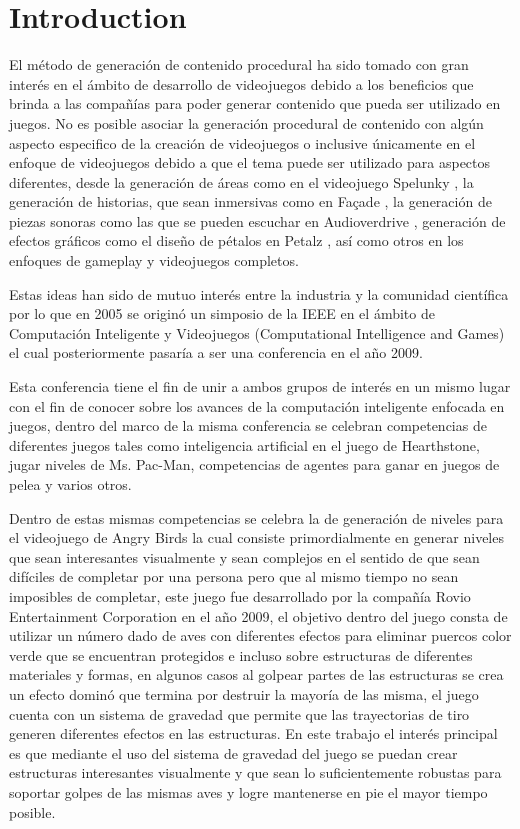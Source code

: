 \chapter{Introduction}
\label{chapter:introduction}

El método de generación de contenido procedural ha sido tomado con
gran interés en el ámbito de desarrollo de videojuegos debido a los beneficios
que brinda a las compañías para poder generar contenido que pueda ser utilizado
en juegos. No es posible asociar la generación procedural de contenido con algún
aspecto especifico de la creación de videojuegos o inclusive únicamente en el
enfoque de videojuegos debido a que el tema puede ser utilizado para 
aspectos diferentes, desde la generación de áreas como en el videojuego Spelunky
\cite{RovioEntertainmentCorporation2009} \cite{Mossmouth2013}
\cite{Mossmouth2013}, la generación de historias, que sean inmersivas como en
Façade \cite{Mateas}, la generación de piezas sonoras como las que se pueden 
escuchar en Audioverdrive \cite{Holtar}, generación de efectos gráficos como
el diseño de pétalos en Petalz \cite{Risi2012}, así como otros en los enfoques
de gameplay y videojuegos completos.

Estas ideas han sido de mutuo interés entre la industria y la comunidad
científica por lo que en 2005 se originó un simposio de la IEEE en el ámbito de
Computación Inteligente y Videojuegos (Computational Intelligence and Games) el
cual posteriormente pasaría a ser una conferencia en el año 2009.

Esta conferencia tiene el fin de unir a ambos grupos de interés en un mismo
lugar con el fin de conocer sobre los avances de la computación inteligente
enfocada en juegos, dentro del marco de la misma conferencia se celebran
competencias de diferentes juegos tales como inteligencia artificial en el juego
de Hearthstone, jugar niveles de Ms. Pac-Man, competencias de agentes para ganar
en juegos de pelea y varios otros.

Dentro de estas mismas competencias se celebra la de generación de niveles para
el videojuego de Angry Birds la cual consiste primordialmente en generar niveles
que sean interesantes visualmente y sean complejos en el sentido de que sean
difíciles de completar por una persona pero que al mismo tiempo no sean
imposibles de completar, este juego fue desarrollado por la compañía Rovio
Entertainment Corporation\cite{RovioEntertainmentCorporation2009} en el año
2009, el objetivo dentro del juego consta de utilizar un número dado de aves con
diferentes efectos para eliminar puercos color verde que se encuentran
protegidos e incluso sobre estructuras de diferentes materiales y formas, en
algunos casos al golpear partes de las estructuras se crea un efecto dominó que
termina por destruir la mayoría de las misma, el juego cuenta con un
sistema de gravedad que permite que las trayectorias de tiro generen diferentes
efectos en las estructuras. En este trabajo el interés principal es que mediante el
uso del sistema de gravedad del juego se puedan crear estructuras
interesantes visualmente y que sean lo suficientemente robustas para soportar
golpes de las mismas aves y logre mantenerse en pie el mayor tiempo posible.


